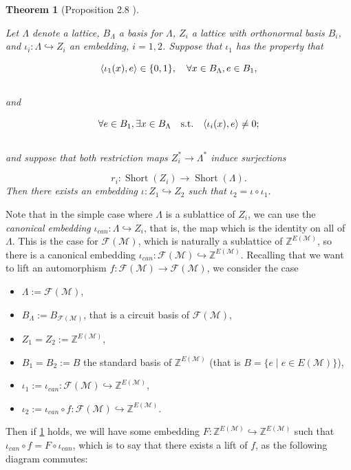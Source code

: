 \documentclass[12pt]{report}
\newtheorem{theorem}{Theorem}[chapter]
\theoremstyle{definition}
\DeclareMathOperator{\Short}{Short}
\DeclarePairedDelimiter\iprod{\langle}{\rangle}
\def\Z{\mathbb Z}
\def\calF{\mathcal F}
\def\calM{\mathcal M}
\theoremstyle{upright}
\begin{document}
\begin{theorem}[Proposition 2.8 \cite{greene2013lattices}]\label{thm:RigidEmb}
    
    Let $\Lambda$ denote a lattice, $B_\Lambda$ a basis for $\Lambda$, $Z_i$ a lattice with orthonormal basis $B_i$, and $\iota_i:\Lambda\hookrightarrow Z_i$ an embedding, $i=1,2$.
    Suppose that $\iota_1$ has the property that
    
    \begin{equation}\label{GreeneProperty1}
        \iprod*{\iota_1(x), e}\in\{0,1\},\quad\forall x\in B_\Lambda,e\in B_1,
    \end{equation}\\
    and
    
    \begin{equation}\label{GreeneProperty2}
        \forall e\in B_1,\exists x\in B_\Lambda\quad\text{s.t.}\quad\iprod*{\iota_i(x), e}\neq0;
    \end{equation}\\
    and suppose that both restriction maps $Z_i^*\to\Lambda^*$ induce surjections
    
    \[r_i:\Short(Z_i)\to\Short(\Lambda).\]
    Then there exists an embedding $\iota:Z_1\hookrightarrow Z_2$ such that $\iota_2=\iota\circ\iota_1$.
    
\end{theorem}

Note that in the simple case where $\Lambda$ is a sublattice of $Z_i$, we can use the \textit{canonical embedding} $\iota_{can}:\Lambda\hookrightarrow Z_i$, that is, the map which is the identity on all of $\Lambda$.
This is the case for  $\calF(\calM)$, which is naturally a sublattice of $\Z^{E(\calM)}$, so there is a canonical embedding $\iota_{can}:\calF(\calM)\hookrightarrow\Z^{E(\calM)}$.
Recalling that we want to lift an automorphism $f:\calF(\calM)\rightarrow\calF(\calM)$, we consider the case

\begin{itemize}
    \item $\Lambda:=\calF(\calM)$,
    \item $B_\Lambda:=B_{\calF(\calM)}$, that is a circuit basis of $\calF(\calM)$,
    \item $Z_1=Z_2:=\Z^{E(\calM)}$,
    \item $B_1=B_2:=B$ the standard basis of $\Z^{E(\calM)}$ (that is $B=\{e\;|\;e\in E(\calM)\}$),
    \item $\iota_1:=\iota_{can}:\calF(\calM)\hookrightarrow\Z^{E(\calM)}$,
    \item $\iota_2:=\iota_{can}\circ f:\calF(\calM)\hookrightarrow\Z^{E(\calM)}$.
\end{itemize}
Then if \cref{thm:RigidEmb} holds, we will have some embedding $F:\Z^{E(\calM)}\hookrightarrow\Z^{E(\calM)}$ such that $\iota_{can}\circ f=F\circ\iota_{can}$, which is to say that there exists a lift of $f$, as the following diagram commutes:
\end{document}
